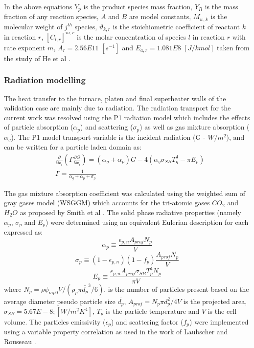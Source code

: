 \documentclass{webofc}
\begin{document}
In the above equations $Y_p$ is the product species mass fraction, $Y_R$ is the mass fraction of any reaction species, $A$ and $B$ are model constants, $M_{w,k}$ is the molecular weight of $j^{th}$ species, $\vartheta_{k,r}$ is the stoichiometric coefficient of reactant $k$ in reaction $r$, $[C_{l,r}]^{m,r}$ is the molar concentration of species $l$ in reaction $r$ with rate exponent $m$, $A_r=2.56E11$ $[s^{-1}]$ and $E_{a,r}=1.081E8$ $[J/kmol]$ taken from the study of He et al \cite{he}.   
\subsubsection{Radiation modelling}

The heat transfer to the furnace, platen and final superheater walls of the validation case are mainly due to radiation. The radiation transport for the current work was resolved using the P1 radiation model which includes the effects of particle absorption ($\alpha_p$) and scattering ($\sigma_p$) as well as gas mixture absorption ($\alpha_g$). The P1 model transport variable is the incident radiation (G - $W/m^2$), and can be written for a particle laden domain as:
\begin{equation}
\begin{split}
&\frac{\partial}{\partial x_{i}}\left(\Gamma\frac{\partial G}{\partial x_{i}}\right)=\left(\alpha_g+\alpha_p\right)G-4\left(\alpha_g \sigma_{SB} T_{g}^4-\pi E_p \right)\\
&\Gamma = \frac{1}{\alpha_g+\alpha_p+\sigma_p}
\end{split}
\end{equation}

The gas mixture absorption coefficient was calculated using the weighted sum of gray gases model (WSGGM) which accounts for the tri-atomic gases $CO_2$ and $H_2O$ as proposed by Smith et al \cite{smith}. The solid phase radiative properties (namely $\alpha_p$, $\sigma_p$ and $E_p$) were determined using an equivalent Eulerian description for each expressed as:\\
\begin{equation}
\alpha_p \equiv \frac{\epsilon_{p,n}A_{proj}N_p}{V}
\end{equation}
\begin{equation}
\sigma_p \equiv (1-\epsilon_{p,n})(1-f_p)\frac{A_{proj} N_p}{V}
\end{equation} 
\begin{equation}
E_p \equiv \frac{\epsilon_{p,n}A_{proj}\sigma_{SB} T_{p}^4 N_p}{\pi V}
\end{equation}
where $N_p = \rho \phi_{mp0} V / \left( \rho_p \pi \bar{d_p}^3 /6 \right)$, is the number of particles present based on the average diameter pseudo particle size $\bar{d_p}$, $A_{proj} = N_p \pi d_p^2 / 4 V$ is the projected area, $\sigma_{SB} = 5.67E-8 ;[W/m^2K^4]$, $T_p$ is the particle temperature and $V$ is the cell volume. The particles emissivity ($\epsilon_p$) and scattering factor ($f_p$) were implemented using a variable property correlation as used in the work of Laubscher and Rousseau \cite{laubscher_3}.
\newpage
\end{document}
